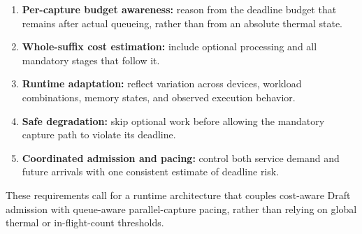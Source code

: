 \begin{enumerate}\setlength{\itemsep}{1pt}\setlength{\parskip}{0pt}\setlength{\parsep}{0pt}
  \item \textbf{Per-capture budget awareness:} reason from the deadline budget that remains after actual queueing, rather than from an absolute thermal state.
  \item \textbf{Whole-suffix cost estimation:} include optional processing and all mandatory stages that follow it.
  \item \textbf{Runtime adaptation:} reflect variation across devices, workload combinations, memory states, and observed execution behavior.
  \item \textbf{Safe degradation:} skip optional work before allowing the mandatory capture path to violate its deadline.
  \item \textbf{Coordinated admission and pacing:} control both service demand and future arrivals with one consistent estimate of deadline risk.
\end{enumerate}

These requirements call for a runtime architecture that couples cost-aware Draft admission with queue-aware parallel-capture pacing, rather than relying on global thermal or in-flight-count thresholds.
